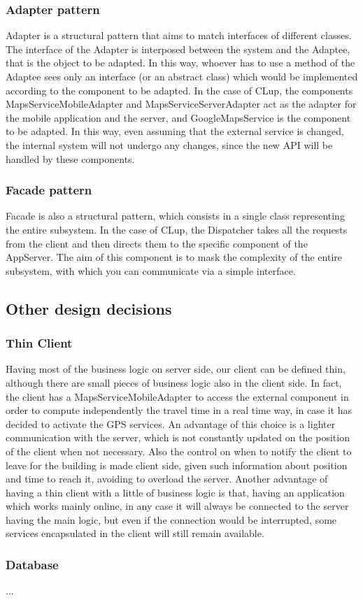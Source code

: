 \subsubsection{Adapter pattern}
Adapter is a structural pattern that aims to match interfaces of different classes. The interface of the Adapter is interposed between the system and the Adaptee, that is the object to be adapted. In this way, whoever has to use a method of the Adaptee sees only an interface (or an abstract class) which would be implemented according to the component to be adapted. In the case of CLup, the components MapsServiceMobileAdapter and MapsServiceServerAdapter act as the adapter for the mobile application and the server, and GoogleMapsService is the component to be adapted. In this way, even assuming that the external service is changed, the internal system will not undergo any changes, since the new API will be handled by these components.\\
\subsubsection{Facade pattern}
Facade is also a structural pattern, which consists in a single class representing the entire subsystem. In the case of CLup, the Dispatcher takes all the requests from the client and then directs them to the specific component of the AppServer. The aim of this component is to mask the complexity of the entire subsystem, with which you can communicate via a simple interface.
\newpage
\subsection {Other design decisions}
\subsubsection{Thin Client}
Having most of the business logic on server side, our client can be defined thin, although there are small pieces of business logic also in the client side. In fact, the client has a MapsServiceMobileAdapter to access the external component in order to compute independently the travel time in a real time way, in case it has decided to activate the GPS services. An advantage of this choice is a lighter communication with the server, which is not constantly updated on the position of the client when not necessary. Also the control on when to notify the client to leave for the building is made client side, given such information about position and time to reach it, avoiding to overload the server.
Another advantage of having a thin client with a little of business logic is that, having an application which works mainly online, in any case it will always be connected to the server having the main logic, but even if the connection would be interrupted, some services encapsulated in the client will still remain available.
\subsubsection{Database}
...
\newpage
